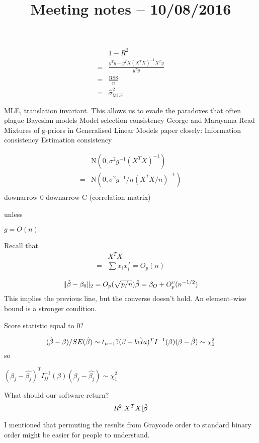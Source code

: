 \documentclass{amsart}
\title{Meeting notes -- 10/08/2016}
\begin{document}
\maketitle
\begin{align*}
&1-R^2 \\
=& \frac{y^T y - y^T X (X^T X)^{-1} X^T y}{y^T y} \\
=& \frac{\text{RSS}}{n} \\
=& \hat{\sigma}^2_{\text{MLE}}
\end{align*}

MLE, translation invariant. This allows us to evade the paradoxes that often plague Bayesian models
Model selection consistency George and Marayama
Read Mixtures of g-priors in Generalised Linear Models paper closely:
Information consistency
Estimation consistency

\newcommand {\N} {\text{N}}
\begin{align*}
&\N(0, \sigma^2 g^{-1} (X^T X)^{-1}) \\
=&\N(0, \sigma^2 g^{-1}/n (X^T X/n)^{-1}) \\
\end{align*}
downarrow 0 downarrow C (correlation matrix)

unless

$g = O(n)$

Recall that
\begin{align*}
&X^T X \\
= &\sum x_i x_i^T = O_p(n)
\end{align*}

\begin{equation*}
\|\hat{\beta} - \beta_0\|_2 = O_p(\sqrt{p/n}) \\
\hat{\beta} = \beta_O + O^v_p (n^{-1/2}) \\
\end{equation*}
This implies the previous line, but the converse doesn't hold. An element--wise bound is a stronger
condition.

Score statistic equal to 0?

\begin{equation*}
(\hat{\beta} - \beta) / SE(\hat{\beta}) \sim t_{n-1}? \\
(\beta - \hat{beta})^T I^{-1} (\beta) (\beta - \hat{\beta}) \sim \chi_1^2 \\
\end{equation*}
so

$(\beta_j - \hat{\beta_j})^T I_{jj}^{-1} (\beta) (\beta_j - \hat{\beta_j}) \sim \chi_1^2$

What should our software return?
\begin{equation*}
R^2 \\
|X^T X| \\
\hat{\beta} \\
\end{equation*}

I mentioned that permuting the results from Graycode order to standard binary order might be easier for
people to understand.
\end{document}
